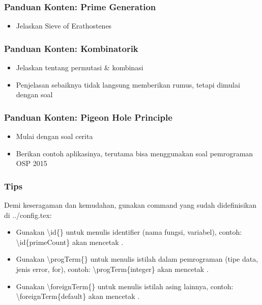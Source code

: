\begin{frame}
\frametitle{Panduan Konten: Prime Generation}
\begin{itemize}
  \item Jelaskan Sieve of Erathostenes
\end{itemize}
\end{frame}

\begin{frame}
\frametitle{Panduan Konten: Kombinatorik}
\begin{itemize}
  \item Jelaskan tentang permutasi \& kombinasi
  \item Penjelasan sebaiknya tidak langsung memberikan rumus, tetapi dimulai dengan soal 
\end{itemize}
\end{frame}

\begin{frame}
\frametitle{Panduan Konten: Pigeon Hole Principle}
\begin{itemize}
  \item Mulai dengan soal cerita
  \item Berikan contoh aplikasinya, terutama bisa menggunakan soal pemrograman OSP 2015
\end{itemize}
\end{frame}

\begin{frame}
\frametitle{Tips}
Demi keseragaman dan kemudahan, gunakan command yang sudah didefinisikan di ../config.tex:
\begin{itemize}
  \item Gunakan \textbackslash id\{\} untuk menulis identifier (nama fungsi, variabel), contoh: \textbackslash id\{primeCount\} akan mencetak .
  \item Gunakan \textbackslash progTerm\{\} untuk menulis istilah dalam pemrograman (tipe data, jenis error, for), contoh: \textbackslash progTerm\{integer\} akan mencetak .
  \item Gunakan \textbackslash foreignTerm\{\} untuk menulis istilah asing lainnya, contoh: \textbackslash foreignTerm\{default\} akan mencetak .
\end{itemize}
\end{frame}

